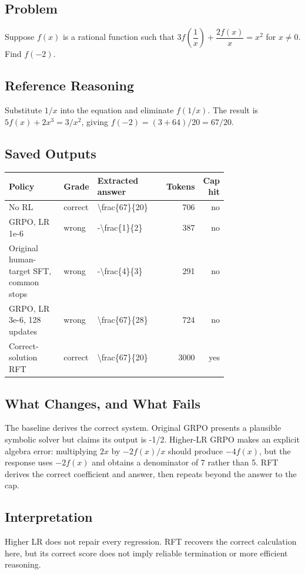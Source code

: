 \documentclass[10pt,letterpaper]{article}
\begin{document}
\subsection*{Problem}
Suppose $f(x)$ is a rational function such that $3f\left(\dfrac{1}{x}\right)+\dfrac{2f(x)}{x}=x^2$ for $x\neq 0$.  Find $f(-2)$.
\subsection*{Reference Reasoning}
Substitute $1/x$ into the equation and eliminate $f(1/x)$. The result is $5f(x)+2x^3=3/x^2$, giving $f(-2)=(3+64)/20=67/20$.
\subsection*{Saved Outputs}
\small\begin{longtable}{p{0.29\linewidth}p{0.10\linewidth}p{0.35\linewidth}rr}\toprule Policy & Grade & Extracted answer & Tokens & Cap hit\\\midrule
No RL & correct & \textbackslash{}frac\{67\}\{20\} & 706 & no\\
GRPO, LR 1e-6 & wrong & -\textbackslash{}frac\{1\}\{2\} & 387 & no\\
Original human-target SFT, common stops & wrong & -\textbackslash{}frac\{4\}\{3\} & 291 & no\\
GRPO, LR 3e-6, 128 updates & wrong & \textbackslash{}frac\{67\}\{28\} & 724 & no\\
Correct-solution RFT & correct & \textbackslash{}frac\{67\}\{20\} & 3000 & yes\\
\bottomrule\end{longtable}\normalsize
\subsection*{What Changes, and What Fails}
The baseline derives the correct system. Original GRPO presents a plausible symbolic solver but claims its output is -1/2. Higher-LR GRPO makes an explicit algebra error: multiplying $2x$ by $-2f(x)/x$ should produce $-4f(x)$, but the response uses $-2f(x)$ and obtains a denominator of 7 rather than 5. RFT derives the correct coefficient and answer, then repeats beyond the answer to the cap.
\subsection*{Interpretation}
Higher LR does not repair every regression. RFT recovers the correct calculation here, but its correct score does not imply reliable termination or more efficient reasoning.
\end{document}
